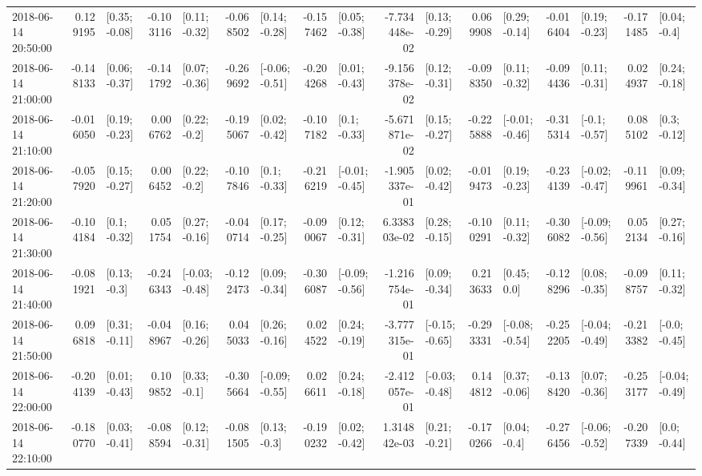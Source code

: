 \begin{tabular}{lrlrlrlrlrlrlrlrl}
2018-06-14 20:50:00 &  0.129195 &   [0.35; -0.08] & -0.103116 &   [0.11; -0.32] & -0.068502 &   [0.14; -0.28] & -0.157462 &   [0.05; -0.38] & -7.734448e-02 &   [0.13; -0.29] &  0.069908 &   [0.29; -0.14] & -0.016404 &   [0.19; -0.23] & -0.171485 &    [0.04; -0.4] \\
2018-06-14 21:00:00 & -0.148133 &   [0.06; -0.37] & -0.141792 &   [0.07; -0.36] & -0.269692 &  [-0.06; -0.51] & -0.204268 &   [0.01; -0.43] & -9.156378e-02 &   [0.12; -0.31] & -0.098350 &   [0.11; -0.32] & -0.094436 &   [0.11; -0.31] &  0.024937 &   [0.24; -0.18] \\
2018-06-14 21:10:00 & -0.016050 &   [0.19; -0.23] &  0.006762 &    [0.22; -0.2] & -0.195067 &   [0.02; -0.42] & -0.107182 &    [0.1; -0.33] & -5.671871e-02 &   [0.15; -0.27] & -0.225888 &  [-0.01; -0.46] & -0.315314 &   [-0.1; -0.57] &  0.085102 &    [0.3; -0.12] \\
2018-06-14 21:20:00 & -0.057920 &   [0.15; -0.27] &  0.006452 &    [0.22; -0.2] & -0.107846 &    [0.1; -0.33] & -0.216219 &  [-0.01; -0.45] & -1.905337e-01 &   [0.02; -0.42] & -0.019473 &   [0.19; -0.23] & -0.234139 &  [-0.02; -0.47] & -0.119961 &   [0.09; -0.34] \\
2018-06-14 21:30:00 & -0.104184 &    [0.1; -0.32] &  0.051754 &   [0.27; -0.16] & -0.040714 &   [0.17; -0.25] & -0.090067 &   [0.12; -0.31] &  6.338303e-02 &   [0.28; -0.15] & -0.100291 &   [0.11; -0.32] & -0.306082 &  [-0.09; -0.56] &  0.052134 &   [0.27; -0.16] \\
2018-06-14 21:40:00 & -0.081921 &    [0.13; -0.3] & -0.246343 &  [-0.03; -0.48] & -0.122473 &   [0.09; -0.34] & -0.306087 &  [-0.09; -0.56] & -1.216754e-01 &   [0.09; -0.34] &  0.213633 &     [0.45; 0.0] & -0.128296 &   [0.08; -0.35] & -0.098757 &   [0.11; -0.32] \\
2018-06-14 21:50:00 &  0.096818 &   [0.31; -0.11] & -0.048967 &   [0.16; -0.26] &  0.045033 &   [0.26; -0.16] &  0.024522 &   [0.24; -0.19] & -3.777315e-01 &  [-0.15; -0.65] & -0.293331 &  [-0.08; -0.54] & -0.252205 &  [-0.04; -0.49] & -0.213382 &   [-0.0; -0.45] \\
2018-06-14 22:00:00 & -0.204139 &   [0.01; -0.43] &  0.109852 &    [0.33; -0.1] & -0.305664 &  [-0.09; -0.55] &  0.026611 &   [0.24; -0.18] & -2.412057e-01 &  [-0.03; -0.48] &  0.144812 &   [0.37; -0.06] & -0.138420 &   [0.07; -0.36] & -0.253177 &  [-0.04; -0.49] \\
2018-06-14 22:10:00 & -0.180770 &   [0.03; -0.41] & -0.088594 &   [0.12; -0.31] & -0.081505 &    [0.13; -0.3] & -0.190232 &   [0.02; -0.42] &  1.314842e-03 &   [0.21; -0.21] & -0.170266 &    [0.04; -0.4] & -0.276456 &  [-0.06; -0.52] & -0.207339 &    [0.0; -0.44] \\

\end{tabular}
